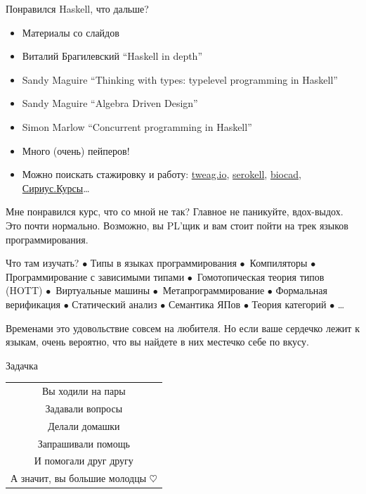     \begin{frame}[fragile]{Понравился Haskell, что дальше?}
        \begin{itemize}
            \item Материалы со слайдов
            \item Виталий Брагилевский ``Haskell in depth''
            \item Sandy Maguire ``Thinking with types: typelevel programming in Haskell''
            \item Sandy Maguire ``Algebra Driven Design''
            \item Simon Marlow ``Concurrent programming in Haskell''
            \item Много (очень) пейперов!
            \item Можно поискать стажировку и работу: \href{https://www.tweag.io/}{\color{blue}tweag.io}, \href{https://serokell.io/}{\color{blue}serokell}, \href{https://biocad.ru/}{\color{blue}biocad}, \href{https://sirius-courses.ru/}{\color{blue}Сириус.Курсы}\ldots
        \end{itemize}
    \end{frame}

    \begin{frame}{Мне понравился курс, что со мной не так?}
        Главное не паникуйте, вдох-выдох. Это почти нормально. Возможно, вы PL'щик и вам стоит пойти на трек языков программирования.

        \vspace{1em}
        Что там изучать? $\bullet$ Типы в языках программирования $\bullet$~Компиляторы $\bullet$ Программирование с зависимыми типами $\bullet$~Гомотопическая теория типов (HOTT) $\bullet$~Виртуальные машины $\bullet$~Метапрограммирование $\bullet$ Формальная верификация $\bullet$ Статический анализ $\bullet$ Семантика ЯПов $\bullet$ Теория категорий $\bullet$ \ldots

        \vspace{1em}
        Временами это удовольствие совсем на любителя. Но если ваше сердечко лежит к языкам, очень вероятно, что вы найдете в них местечко себе по вкусу.
    \end{frame}

    \begin{frame}[fragile]{Задачка}
        \begin{center}
            \begin{tabular}{c}
                 Вы ходили на пары \\
                 Задавали вопросы \\
                 Делали домашки \\
                 Запрашивали помощь \\
                 И помогали друг другу \\
                \hline
                 А значит, вы большие молодцы $\heartsuit$
            \end{tabular}
        \end{center}
    \end{frame}


